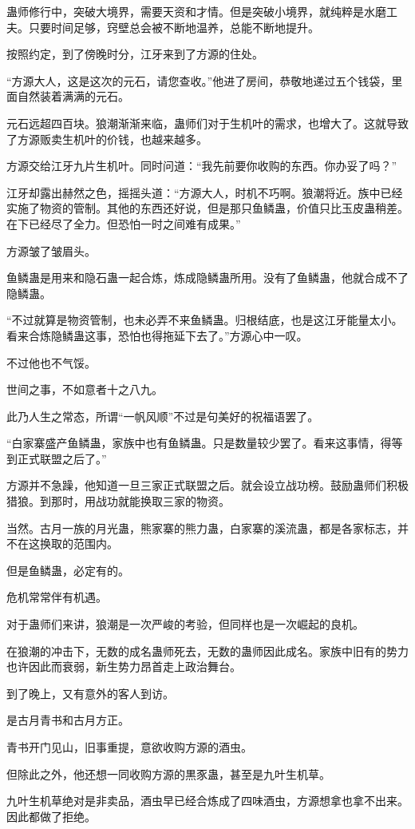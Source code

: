 \begin{this_body}
蛊师修行中，突破大境界，需要天资和才情。但是突破小境界，就纯粹是水磨工夫。只要时间足够，窍壁总会被不断地温养，总能不断地提升。

按照约定，到了傍晚时分，江牙来到了方源的住处。

“方源大人，这是这次的元石，请您查收。”他进了房间，恭敬地递过五个钱袋，里面自然装着满满的元石。

元石远超四百块。狼潮渐渐来临，蛊师们对于生机叶的需求，也增大了。这就导致了方源贩卖生机叶的价钱，也越来越多。

方源交给江牙九片生机叶。同时问道：“我先前要你收购的东西。你办妥了吗？”

江牙却露出赫然之色，摇摇头道：“方源大人，时机不巧啊。狼潮将近。族中已经实施了物资的管制。其他的东西还好说，但是那只鱼鳞蛊，价值只比玉皮蛊稍差。在下已经尽了全力。但恐怕一时之间难有成果。”

方源皱了皱眉头。

鱼鳞蛊是用来和隐石蛊一起合炼，炼成隐鳞蛊所用。没有了鱼鳞蛊，他就合成不了隐鳞蛊。

“不过就算是物资管制，也未必弄不来鱼鳞蛊。归根结底，也是这江牙能量太小。看来合炼隐鳞蛊这事，恐怕也得拖延下去了。”方源心中一叹。

不过他也不气馁。

世间之事，不如意者十之八九。

此乃人生之常态，所谓“一帆风顺”不过是句美好的祝福语罢了。

“白家寨盛产鱼鳞蛊，家族中也有鱼鳞蛊。只是数量较少罢了。看来这事情，得等到正式联盟之后了。”

方源并不急躁，他知道一旦三家正式联盟之后。就会设立战功榜。鼓励蛊师们积极猎狼。到那时，用战功就能换取三家的物资。

当然。古月一族的月光蛊，熊家寨的熊力蛊，白家寨的溪流蛊，都是各家标志，并不在这换取的范围内。

但是鱼鳞蛊，必定有的。

危机常常伴有机遇。

对于蛊师们来讲，狼潮是一次严峻的考验，但同样也是一次崛起的良机。

在狼潮的冲击下，无数的成名蛊师死去，无数的蛊师因此成名。家族中旧有的势力也许因此而衰弱，新生势力昂首走上政治舞台。

到了晚上，又有意外的客人到访。

是古月青书和古月方正。

青书开门见山，旧事重提，意欲收购方源的酒虫。

但除此之外，他还想一同收购方源的黒豕蛊，甚至是九叶生机草。

九叶生机草绝对是非卖品，酒虫早已经合炼成了四味酒虫，方源想拿也拿不出来。因此都做了拒绝。


\end{this_body}
